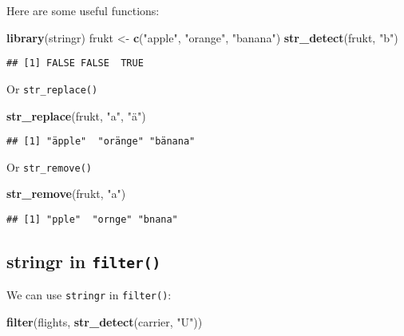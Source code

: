 \documentclass[]{book}
\newenvironment{Shaded}{\begin{snugshade}}{\end{snugshade}}
\newcommand{\KeywordTok}[1]{\textcolor[rgb]{0.13,0.29,0.53}{\textbf{#1}}}
\newcommand{\NormalTok}[1]{#1}
\newcommand{\StringTok}[1]{\textcolor[rgb]{0.31,0.60,0.02}{#1}}
\begin{document}
Here are some useful functions:

\begin{Shaded}
\begin{Highlighting}[]
\KeywordTok{library}\NormalTok{(stringr)}
\NormalTok{frukt <-}\StringTok{ }\KeywordTok{c}\NormalTok{(}\StringTok{"apple"}\NormalTok{, }\StringTok{"orange"}\NormalTok{, }\StringTok{"banana"}\NormalTok{)}
\KeywordTok{str_detect}\NormalTok{(frukt, }\StringTok{"b"}\NormalTok{)}
\end{Highlighting}
\end{Shaded}

\begin{verbatim}
## [1] FALSE FALSE  TRUE
\end{verbatim}

Or \texttt{str\_replace()}

\begin{Shaded}
\begin{Highlighting}[]
\KeywordTok{str_replace}\NormalTok{(frukt, }\StringTok{"a"}\NormalTok{, }\StringTok{"ä"}\NormalTok{)}
\end{Highlighting}
\end{Shaded}

\begin{verbatim}
## [1] "äpple"  "oränge" "bänana"
\end{verbatim}

Or \texttt{str\_remove()}

\begin{Shaded}
\begin{Highlighting}[]
\KeywordTok{str_remove}\NormalTok{(frukt, }\StringTok{"a"}\NormalTok{)}
\end{Highlighting}
\end{Shaded}

\begin{verbatim}
## [1] "pple"  "ornge" "bnana"
\end{verbatim}

\hypertarget{stringr-in-filter}{%
\subsection{\texorpdfstring{stringr in \texttt{filter()}}{stringr in filter()}}\label{stringr-in-filter}}

We can use \texttt{stringr} in \texttt{filter()}:

\begin{Shaded}
\begin{Highlighting}[]
\KeywordTok{filter}\NormalTok{(flights, }\KeywordTok{str_detect}\NormalTok{(carrier, }\StringTok{"U"}\NormalTok{))}
\end{Highlighting}
\end{Shaded}
\end{document}
